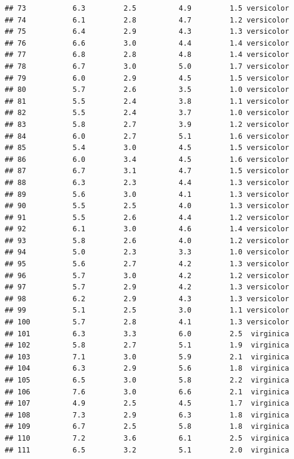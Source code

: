 \documentclass[
]{article}
\begin{document}
\begin{verbatim}
## 73           6.3         2.5          4.9         1.5 versicolor
## 74           6.1         2.8          4.7         1.2 versicolor
## 75           6.4         2.9          4.3         1.3 versicolor
## 76           6.6         3.0          4.4         1.4 versicolor
## 77           6.8         2.8          4.8         1.4 versicolor
## 78           6.7         3.0          5.0         1.7 versicolor
## 79           6.0         2.9          4.5         1.5 versicolor
## 80           5.7         2.6          3.5         1.0 versicolor
## 81           5.5         2.4          3.8         1.1 versicolor
## 82           5.5         2.4          3.7         1.0 versicolor
## 83           5.8         2.7          3.9         1.2 versicolor
## 84           6.0         2.7          5.1         1.6 versicolor
## 85           5.4         3.0          4.5         1.5 versicolor
## 86           6.0         3.4          4.5         1.6 versicolor
## 87           6.7         3.1          4.7         1.5 versicolor
## 88           6.3         2.3          4.4         1.3 versicolor
## 89           5.6         3.0          4.1         1.3 versicolor
## 90           5.5         2.5          4.0         1.3 versicolor
## 91           5.5         2.6          4.4         1.2 versicolor
## 92           6.1         3.0          4.6         1.4 versicolor
## 93           5.8         2.6          4.0         1.2 versicolor
## 94           5.0         2.3          3.3         1.0 versicolor
## 95           5.6         2.7          4.2         1.3 versicolor
## 96           5.7         3.0          4.2         1.2 versicolor
## 97           5.7         2.9          4.2         1.3 versicolor
## 98           6.2         2.9          4.3         1.3 versicolor
## 99           5.1         2.5          3.0         1.1 versicolor
## 100          5.7         2.8          4.1         1.3 versicolor
## 101          6.3         3.3          6.0         2.5  virginica
## 102          5.8         2.7          5.1         1.9  virginica
## 103          7.1         3.0          5.9         2.1  virginica
## 104          6.3         2.9          5.6         1.8  virginica
## 105          6.5         3.0          5.8         2.2  virginica
## 106          7.6         3.0          6.6         2.1  virginica
## 107          4.9         2.5          4.5         1.7  virginica
## 108          7.3         2.9          6.3         1.8  virginica
## 109          6.7         2.5          5.8         1.8  virginica
## 110          7.2         3.6          6.1         2.5  virginica
## 111          6.5         3.2          5.1         2.0  virginica

\end{verbatim}
\end{document}
